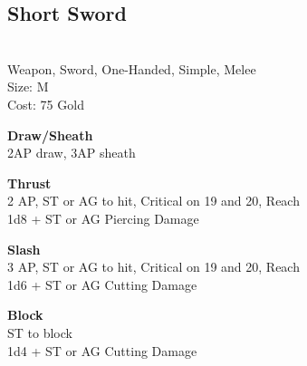 \subsection{Short Sword}\label{weapon:shortSword}\\
Weapon, Sword, One-Handed, Simple, Melee\\
Size: M\\
Cost: 75 Gold

\textbf{Draw/Sheath}\\
2AP draw, 3AP sheath

\textbf{Thrust}\\
2 AP, ST or AG to hit, Critical on 19 and 20,  Reach\\
1d8 + \texttimes ST or AG Piercing Damage

\textbf{Slash}\\
3 AP, ST or AG to hit, Critical on 19 and 20,  Reach\\
1d6 + \texttimes ST or AG Cutting Damage

\textbf{Block}\\
ST to block\\
1d4 + \texttimes ST or AG Cutting Damage

